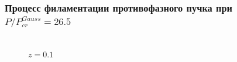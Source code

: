 \documentclass[fullscreen=true,unicode,bookmarks=true]{beamer}
\begin{document}
    \begin{frame}
        \frametitle{Процесс филаментации противофазного пучка при~$P/P_{cr}^{Gauss} = 26.5$}

            \begin{figure}[H]
                \begin{center}
                    \begin{minipage}[h]{0.24\linewidth}
                         \\ \footnotesize{$z=0.1$} \\
                    \end{minipage}
                    \hfill
                    \begin{minipage}[h]{0.24\linewidth}

\end{minipage}
\end{center}
\end{figure}
\end{frame}
\end{document}
